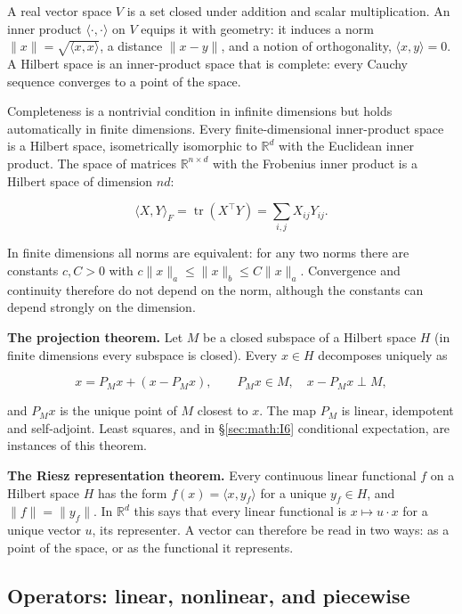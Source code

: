 A real vector space \(V\) is a set closed under addition and scalar
multiplication. An inner product \(\langle\cdot,\cdot\rangle\) on \(V\) equips it with geometry: it
induces a norm \(\|x\| = \sqrt{\langle x,x\rangle}\), a distance \(\|x - y\|\), and a notion of
orthogonality, \(\langle x,y\rangle = 0\). A Hilbert space is an inner-product space that
is complete: every Cauchy sequence converges to a point of the space.

Completeness is a nontrivial condition in infinite dimensions but holds
automatically in finite dimensions. Every finite-dimensional
inner-product space is a Hilbert space, isometrically isomorphic to
\(\mathbb{R}^{d}\) with the Euclidean inner product. The space of
matrices \(\mathbb{R}^{n\times d}\) with the Frobenius inner product is
a Hilbert space of dimension \(nd\):

\[
\langle X, Y\rangle_F = \operatorname{tr}(X^\top Y) = \sum_{i,j} X_{ij} Y_{ij}.
\]

In finite dimensions all norms are equivalent: for any two norms there
are constants \(c, C > 0\) with \(c\|x\|_a \le \|x\|_b \le C\|x\|_a\).
Convergence and continuity therefore do not depend on the norm, although
the constants can depend strongly on the dimension.

\textbf{The projection theorem.} Let \(M\) be a closed subspace of a Hilbert
space \(H\) (in finite dimensions every subspace is closed). Every \(x \in H\)
decomposes uniquely as

\[
x = P_M x + (x - P_M x), \qquad P_M x \in M, \quad x - P_M x \perp M,
\]

and \(P_M x\) is the unique point of \(M\) closest to \(x\). The map \(P_M\) is
linear, idempotent and self-adjoint. Least squares, and in \S\ref{sec:math:I6}
conditional expectation, are instances of this theorem.

\textbf{The Riesz representation theorem.} Every continuous linear
functional \(f\) on a Hilbert space \(H\) has the form \(f(x) = \langle x, y_f\rangle\) for a
unique \(y_f \in H\), and \(\|f\| = \|y_f\|\). In \(\mathbb{R}^{d}\) this says that
every linear functional is \(x \mapsto u \cdot x\) for a unique vector \(u\), its
representer. A vector can therefore be read in two ways: as a point of
the space, or as the functional it represents.

\subsection{Operators: linear, nonlinear, and
piecewise}\label{sec:math:I2}

